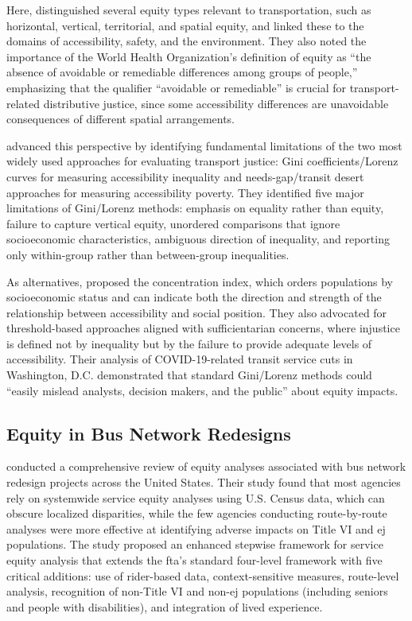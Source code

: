 Here, \textcite{vanweeEvaluatingTransportEquity2021} distinguished several equity types relevant to transportation, such as horizontal, vertical, territorial, and spatial equity, and linked these to the domains of accessibility, safety, and the environment. They also noted the importance of the World Health Organization's definition of equity as ``the absence of avoidable or remediable differences among groups of people,'' emphasizing that the qualifier ``avoidable or remediable'' is crucial for transport-related distributive justice, since some accessibility differences are unavoidable consequences of different spatial arrangements.

\textcite{karnerAdvancesPitfallsMeasuring2025} advanced this perspective by identifying fundamental limitations of the two most widely used approaches for evaluating transport justice: Gini coefficients/Lorenz curves for measuring accessibility inequality and needs-gap/transit desert approaches for measuring accessibility poverty. They identified five major limitations of Gini/Lorenz methods: emphasis on equality rather than equity, failure to capture vertical equity, unordered comparisons that ignore socioeconomic characteristics, ambiguous direction of inequality, and reporting only within-group rather than between-group inequalities.

As alternatives, \textcite{karnerAdvancesPitfallsMeasuring2025} proposed the concentration index, which orders populations by socioeconomic status and can indicate both the direction and strength of the relationship between accessibility and social position. They also advocated for threshold-based approaches aligned with sufficientarian concerns, where injustice is defined not by inequality but by the failure to provide adequate levels of accessibility. Their analysis of COVID-19-related transit service cuts in Washington, D.C. demonstrated that standard Gini/Lorenz methods could ``easily mislead analysts, decision makers, and the public'' about equity impacts.

\subsection{Equity in Bus Network Redesigns}

\textcite{situTitleVIEnough2025} conducted a comprehensive review of equity analyses associated with bus network redesign projects across the United States. Their study found that most agencies rely on systemwide service equity analyses using U.S. Census data, which can obscure localized disparities, while the few agencies conducting route-by-route analyses were more effective at identifying adverse impacts on Title VI and \gls{ej} populations. The study proposed an enhanced stepwise framework for service equity analysis that extends the \gls{fta}'s standard four-level framework with five critical additions: use of rider-based data, context-sensitive measures, route-level analysis, recognition of non-Title VI and non-\gls{ej} populations (including seniors and people with disabilities), and integration of lived experience.


